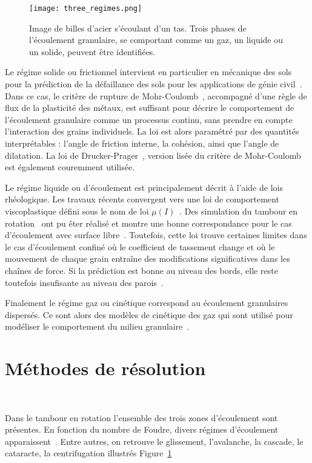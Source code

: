 \begin{figure}
    \texttt{[image: three\_regimes.png]}
    \caption{Image de billes d'acier s'écoulant d'un tas. Trois phases de l'écoulement granulaire, se comportant comme un gaz, un liquide ou un solide, peuvent être identifiées.~\cite{forterre_flows_2008}}
\end{figure}

Le régime solide ou frictionnel intervient en particulier en mécanique des sols pour la prédiction de la défaillance des sols pour les applications de génie civil~\cite{Campbell2006}. Dans ce cas, le critère de rupture de Mohr-Coulomb~\cite{Juvinal1991}, accompagné d'une règle de flux de la plasticité des métaux, est suffisant pour décrire le comportement de l'écoulement granulaire comme un processus continu, sans prendre en compte l'interaction des grains individuels. La loi est alors paramétré par des quantités interprétables : l'angle de friction interne, la cohésion, ainsi que l'angle de dilatation. La loi de Drucker-Prager~\cite{Drucker1952}, version lisée du critère de Mohr-Coulomb est également couremment utilisée.


Le régime liquide ou d'écoulement est principalement décrit à l'aide de lois rhéologique. Les travaux récents convergent vers une loi de comportement viscoplastique défini sous le nom de loi $\mu(I)$~\cite{gdr_midi_dense_2004,jop_constitutive_2006}. Des simulation du tambour en rotation~\cite{Cortet_2009} ont pu êter réalisé et montre une bonne correspondance pour le cas d'écoulement avec surface libre~\cite{chou_cross-sectional_2009}. Toutefois, cette loi trouve certaines limites dans le cas d'écoulement confiné où le coefficient de tassement change et où le mouvement de chaque grain entraîne des modifications significatives dans les chaînes de force. Si la prédiction est bonne au niveau des bords, elle reste toutefois insufisante au niveau des parois~\cite{Rognon_Miller_Metzger_Einav_2015}.

Finalement le régime gaz ou cinétique correspond au écoulement granulaires dispersés. Ce sont alors des modèles de cinétique des gaz qui sont utilisé pour modéliser le comportement du milieu granulaire~\cite{Ng2008}.

\section{Méthodes de résolution}~\label{sec:methode_resolution}

Dans le tambour en rotation l'ensemble des trois zones d'écoulement sont présentes. En fonction du nombre de Foudre, divers régimes d'écoulement apparaissent~\cite{MELLMANN2001251}. Entre autres, on retrouve le glissement, l'avalanche, la cascade, le cataracte, la centrifugation illustrés Figure~\ref{}

